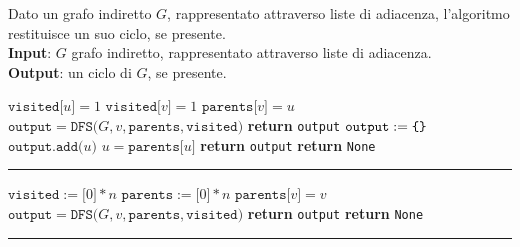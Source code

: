 \documentclass[14pt]{extreport}
\newenvironment{nocaptionalg} %
{
    \par\addvspace{\topsep}
    \centering
    \begin{minipage}{\linewidth}
    \hrule\kern2pt
}
{
    \par\kern2pt\hrule
    \end{minipage}
    \par\addvspace{\topsep}
}
\theoremstyle{definition}
\theoremstyle{definition}
\begin{document}
\begin{algorithm}[H]
    \caption{
        Dato un grafo indiretto $G$, rappresentato attraverso liste di adiacenza, l'algoritmo restituisce un suo ciclo, se presente.\\
        \textbf{Input}: $G$ grafo indiretto, rappresentato attraverso liste di adiacenza.\\
        \textbf{Output}: un ciclo di $G$, se presente.
    }

    \begin{algorithmic}[1]
        \label{findCycleNonDir}
            \State $\texttt{visited[}u\texttt{]} = 1$
                    \State $\texttt{visited[}v\texttt{]} = 1$
                    \State $\texttt{parents[}v\texttt{]} = u$
                    \State $\texttt{output} = \texttt{DFS(}G, v, \texttt{parents}, \texttt{visited)}$
                        \State \textbf{return} \texttt{output}
                    \EndIf
                 
                    \State $\texttt{output} := \verb|{| \verb|}|$
                        \State $\texttt{output.add(}u\texttt{)}$
                        \State $u = \texttt{parents[}u\texttt{]}$
                    \EndWhile
                    \State \textbf{return} \texttt{output}
                \EndIf
            \EndFor
            \State \textbf{return} \texttt{None}
        \EndFunction
    \end{algorithmic}
\end{algorithm}

\begin{nocaptionalg}
    \begin{algorithmic}[1]
            \State $\texttt{visited} := \texttt{[}0\texttt{]} * n$
            \State $\texttt{parents} := \texttt{[}0\texttt{]} * n$
                    \State $\texttt{parents[}v\texttt{]} = v$ 
                    \State $\texttt{output} = \texttt{DFS(}G, v, \texttt{parents}, \texttt{visited)}$
                        \State \textbf{return} \texttt{output}
                    \EndIf
                \EndIf
            \EndFor
            \State \textbf{return} \texttt{None}
        \EndFunction
    \end{algorithmic}
\end{nocaptionalg}
\end{document}
